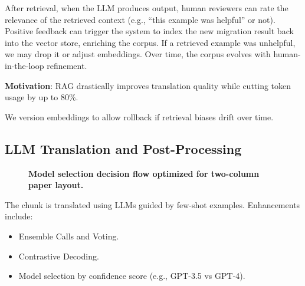\documentclass[twocolumn]{article}
\begin{document}
After retrieval, when the LLM produces output, human reviewers can rate the relevance of the retrieved context (e.g., ``this example was helpful'' or not). Positive feedback can trigger the system to index the new migration result back into the vector store, enriching the corpus. If a retrieved example was unhelpful, we may drop it or adjust embeddings. Over time, the corpus evolves with human-in-the-loop refinement.

\textbf{Motivation}: RAG drastically improves translation quality while cutting token usage by up to 80\%.

We version embeddings to allow rollback if retrieval biases drift over time.

\subsection{LLM Translation and Post-Processing}
    
    \begin{figure}[htbp]
        \centering
        \caption{\textbf{Model selection decision flow optimized for two-column paper layout.}}
        \label{fig:model_selection_compact}
        \end{figure}
        
        

The chunk is translated using LLMs guided by few-shot examples. Enhancements include:

\begin{itemize}
    \item Ensemble Calls and Voting.
    \item Contrastive Decoding.
    \item Model selection by confidence score (e.g., GPT-3.5 vs GPT-4).
\end{itemize}
\end{document}
